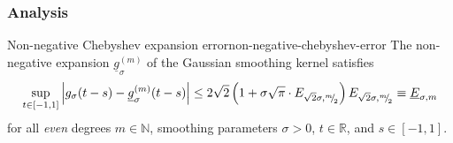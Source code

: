 \documentclass[12pt]{article}
\begin{document}




\subsubsection{Analysis}
\label{subsubsec:chebyshev-nystrom-analysis}

\begin{lemma}{Non-negative Chebyshev expansion error}{non-negative-chebyshev-error}
    The non-negative expansion $\underline{g}_{\sigma}^{(m)}$ of the Gaussian smoothing kernel satisfies
    \begin{equation}
        \sup_{t \in [-1, 1]} \left| g_{\sigma}(t - s) - \underline{g}_{\sigma}^{(m)}(t - s) \right| \leq 2\sqrt{2} \left(1 + \sigma \sqrt{\pi} \cdot E_{\sqrt{2}\sigma, {}^{m}{\mskip -5mu/\mskip -3mu}_{2}}\right) E_{\sqrt{2}\sigma, {}^{m}{\mskip -5mu/\mskip -3mu}_{2}} \equiv \underline{E}_{\sigma, m}
        \label{equ:2-chebyshev-interpolation-sup-error-kernel}
    \end{equation}
    for all \emph{even} degrees $m \in \mathbb{N}$, smoothing parameters $\sigma > 0$, $t \in \mathbb{R}$, and $s \in [-1, 1]$.
\end{lemma}
\end{document}
